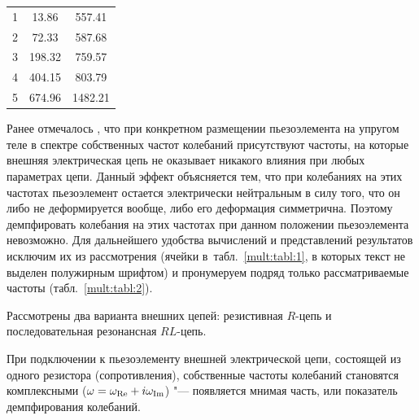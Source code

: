 \begin{table}[b!]
\begin{tabular}[h]{c|c|c}
\hline

\rule{0mm}{12pt}%

1 & 13.86  & 557.41 \\

2 & 72.33  & 587.68 \\

3 & 198.32 & 759.57 \\

4 & 404.15 & 803.79 \\

5 & 674.96 & 1482.21 \\

\hline

\end{tabular}

\end{table}





Ранее отмечалось \cite{mult:Ref26}, что при конкретном размещении пьезоэлемента на упругом теле в спектре собственных частот колебаний присутствуют частоты, на которые внешняя электрическая цепь не оказывает никакого влияния при любых параметрах цепи. Данный эффект объясняется тем, что при колебаниях на этих частотах пьезоэлемент остается электрически нейтральным в силу того, что он либо не деформируется вообще, либо его деформация симметрична. Поэтому демпфировать колебания на этих частотах при данном положении пьезоэлемента невозможно. Для дальнейшего удобства вычислений и представлений результатов исключим их из рассмотрения (ячейки в~табл.~\ref{mult:tabl:1}, в которых текст не выделен полужирным шрифтом) и пронумеруем подряд только рассматриваемые частоты (табл.~\ref{mult:tabl:2}).



Рассмотрены два варианта внешних цепей: резистивная $R$-цепь и последовательная резонансная $RL$-цепь.



\smallskip




При подключении к пьезоэлементу внешней электрической цепи, состоящей из одного резистора (сопротивления), собственные частоты колебаний становятся комплексными ($\omega=\omega_{\rm Re}+i\omega_{\rm Im}$) "--- появляется мнимая часть, или показатель демпфирования колебаний.



